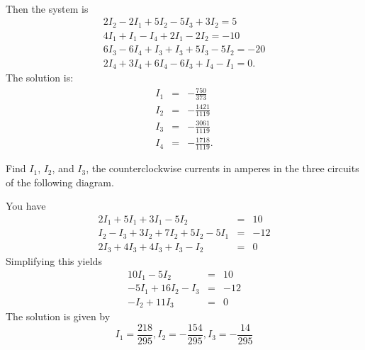 \begin{enumialphparenastyle}
\begin{ex}
\begin{sol}
\begin{eqnarray*}
    \end{eqnarray*}
    Then the system is 
    \[
      \begin{array}{c}
        2I_{2}-2I_{1}+5I_{2}-5I_{3}+3I_{2}=5 \\
        4I_{1}+I_{1}-I_{4}+2I_{1}-2I_{2}=-10 \\
        6I_{3}-6I_{4}+I_{3}+I_{3}+5I_{3}-5I_{2}=-20 \\
        2I_{4}+3I_{4}+6I_{4}-6I_{3}+I_{4}-I_{1}=0.
      \end{array}
    \]
    The solution is:
    \begin{eqnarray*}
      I_{1}&=& -\frac{750}{373} \\
      I_{2}&=& -\frac{1421}{1119} \\
      I_{3}&=& -\frac{3061}{1119} \\
      I_{4}&=& -\frac{1718}{1119}.
    \end{eqnarray*}
  \end{sol}
\end{ex}

\begin{ex} Find $I_{1}$, $I_{2}$, and $I_{3}$, the counterclockwise currents in
  amperes in the three circuits of the following diagram.
  
  \begin{center}
  \end{center}
  
  \begin{sol}
    You
    have
    \begin{eqnarray*}
      2I_{1}+5I_{1}+3I_{1}-5I_{2} &=& 10 \\
      I_{2}- I_{3} +3I_{2}+7I_{2}+5I_{2}-5I_{1}  &=&-12 \\
      2I_{3}+4I_{3}+4I_{3}+I_{3}-I_{2} &=& 0
    \end{eqnarray*}
    Simplifying this yields
    \begin{eqnarray*}
      10I_{1}-5I_{2} &=& 10 \\
      -5I_{1} + 16I_{2}- I_{3} &=&-12 \\
      -I_{2} + 11I_{3} &=&0
    \end{eqnarray*}
    The solution is given by 
    \[
      I_{1}=\frac{218}{295},I_{2}=-\frac{154}{295},I_{3}=-\frac{14}{295}
    \]
    

\end{sol}
\end{ex}
\end{enumialphparenastyle}
